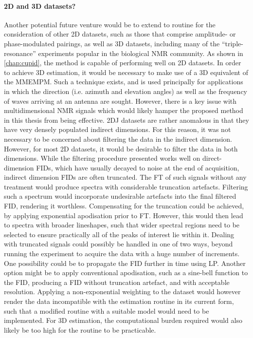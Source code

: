 \paragraph{\ac{2D} and \ac{3D} datasets?}
Another potential future venture would be to extend to routine for the
consideration of other \ac{2D} datasets, such as those that comprise
amplitude- or phase-modulated pairings, as well as \ac{3D} datasets,
including many of the ``triple-resonance'' experiments popular in the
biological \ac{NMR} community\cite[Section 7.4]{Cavanagh2007}. As shown in
\cref{chap:cupid}, the method is capable of performing well on \ac{2D}
datasets. In order to achieve \ac{3D} estimation, it would be necessary to
make use of a \ac{3D} equivalent of the \ac{MMEMPM}. Such a technique exists,
and is used principally for applications in which the direction (i.e. azimuth
and elevation angles) as well as the frequency of waves arriving at an antenna
are sought\cite{Yilmazer2006}. However, there is a key issue with
multidimensional \ac{NMR} signals which would likely hamper the proposed method
in this thesis from being effective. \ac{2DJ} datasets are rather anomalous in
that they have very densely populated indirect dimensions. For this reason, it
was not necessary to be concerned about filtering the data in the indirect
dimension. However, for most \ac{2D} datasets, it would be desirable to filter
the data in both dimensions. While the filtering procedure presented works well
on direct-dimension \acp{FID}, which have usually decayed to noise at the end
of acquisition, indirect dimension \acp{FID} are often truncated. The \ac{FT}
of such signals without any treatment would produce spectra with considerable
truncation artefacts. Filtering such a spectrum would incorporate undesirable
artefacts into the final filtered \ac{FID}, rendering it worthless.
Compensating for the truncation could be achieved, by applying exponential
apodisation prior to \ac{FT}. However, this would then lead to spectra with
broader lineshapes, such that wider spectral regions need to be selected to
ensure practically all of the peaks of interest lie within it. Dealing with
truncated signals could possibly be handled in one of two ways, beyond running
the experiment to acquire the data with a huge number of increments. One
possibility could be to propagate the \ac{FID} further in time using \ac{LP}.
Another option might be to apply conventional apodisation, such as a sine-bell
function to the \ac{FID}, producing a \ac{FID} without truncation artefact, and
with acceptable resolution. Applying a non-exponential weighting to the dataset
would however render the data incompatible with the estimation routine in its
current form, such that a modified routine with a suitable model would need to
be implemented. For \ac{3D} estimation, the computational burden required would
also likely be too high for the routine to be practicable. 

